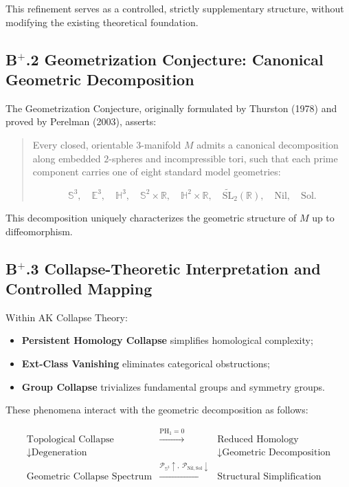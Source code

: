 \documentclass[11pt]{article}
\begin{document}
This refinement serves as a controlled, strictly supplementary structure, without modifying the existing theoretical foundation.

\subsection*{B$^{+}$.2 Geometrization Conjecture: Canonical Geometric Decomposition}

The Geometrization Conjecture, originally formulated by Thurston (1978) and proved by Perelman (2003), asserts:

\begin{quote}
Every closed, orientable $3$-manifold $M$ admits a canonical decomposition along embedded $2$-spheres and incompressible tori, such that each prime component carries one of eight standard model geometries:

\[
\mathbb{S}^3,\quad \mathbb{E}^3,\quad \mathbb{H}^3,\quad \mathbb{S}^2 \times \mathbb{R},\quad \mathbb{H}^2 \times \mathbb{R},\quad \widetilde{\mathrm{SL}}_2(\mathbb{R}),\quad \mathrm{Nil},\quad \mathrm{Sol}.
\]
\end{quote}

This decomposition uniquely characterizes the geometric structure of $M$ up to diffeomorphism.

\subsection*{B$^{+}$.3 Collapse-Theoretic Interpretation and Controlled Mapping}

Within AK Collapse Theory:

\begin{itemize}
    \item \textbf{Persistent Homology Collapse} simplifies homological complexity;
    \item \textbf{Ext-Class Vanishing} eliminates categorical obstructions;
    \item \textbf{Group Collapse} trivializes fundamental groups and symmetry groups.
\end{itemize}

These phenomena interact with the geometric decomposition as follows:

\[
\begin{array}{ccc}
\text{Topological Collapse} & \xrightarrow{\mathrm{PH}_1 = 0} & \text{Reduced Homology} \\
\downarrow \text{Degeneration} & & \downarrow \text{Geometric Decomposition} \\
\text{Geometric Collapse Spectrum} & \xrightarrow{\mathcal{P}_{\mathbb{S}^3} \uparrow,\;\mathcal{P}_{\mathrm{Nil},\mathrm{Sol}} \downarrow} & \text{Structural Simplification}
\end{array}
\]
\end{document}
